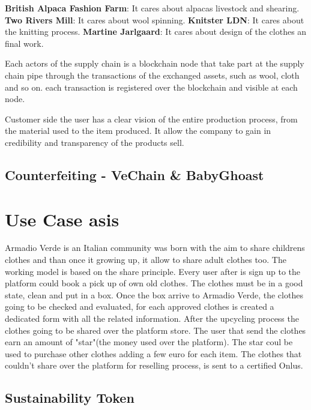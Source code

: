 \begin{outline}
    \1 \textbf{British Alpaca Fashion Farm}: It cares about alpacas livestock and shearing.
    \1 \textbf{Two Rivers Mill}: It cares about wool spinning.
    \1 \textbf{Knitster LDN}: It cares about the knitting process.
    \1 \textbf{Martine Jarlgaard}: It cares about design of the clothes an final work.
\end{outline}

Each actors of the supply chain is a blockchain node that take part at the supply chain pipe through
the transactions of the exchanged assets, such as wool, cloth and so on. each transaction is registered
over the blockchain and visible at each node. 

Customer side the user has a clear vision of the entire production process, from the material used to the 
item produced. It allow the company to gain in credibility and transparency of the products sell. 

\subsection{Counterfeiting - VeChain & BabyGhoast}


\section{Use Case asis}

Armadio Verde is an Italian community was born with the aim to share childrens clothes and than once it 
growing up, it allow to share adult clothes too. The working model is based on the share principle. Every 
user after is sign up to the platform could book a pick up of own old clothes. The clothes must be in a 
good state, clean and put in a box. Once the box arrive to Armadio Verde, the clothes going to be checked 
and evaluated, for each approved clothes is created a dedicated form with all the related information. 
After the upcycling process the clothes going to be shared over the platform store. The user that send 
the clothes earn an amount of "star"(the money used over the platform). The star coul be used to purchase 
other clothes adding a few euro for each item. The clothes that couldn't share over the platform for 
reselling process, is sent to a certified Onlus.

\subsection{Sustainability Token}

